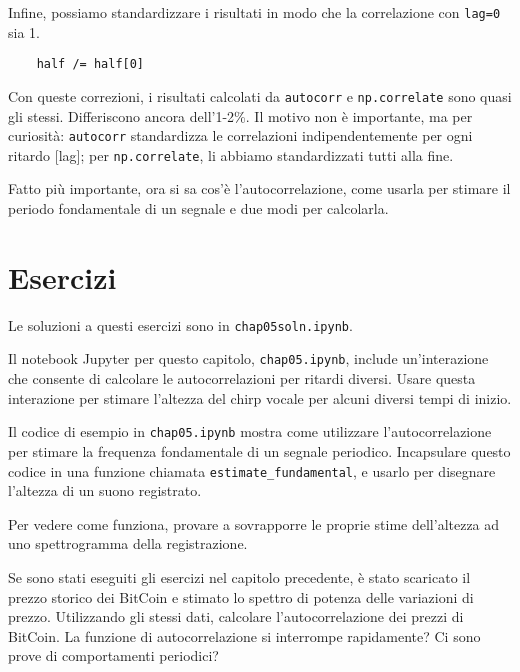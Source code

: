 \documentclass[12pt,a4paper]{book}
\begin{document}
Infine, possiamo standardizzare i risultati in modo che la correlazione con {\tt lag=0} sia 1.

\begin{verbatim} 
    half /= half[0]
 \end{verbatim} 

Con queste correzioni, i risultati calcolati da {\tt autocorr} e {\tt np.correlate} sono quasi gli stessi. Differiscono ancora dell'1-2\%. Il motivo non è importante, ma per curiosità: {\tt autocorr} standardizza le correlazioni indipendentemente per ogni ritardo [lag]; per {\tt np.correlate}, li abbiamo standardizzati tutti alla fine.

Fatto più importante, ora si sa cos'è l'autocorrelazione, come usarla per stimare il periodo fondamentale di un segnale e due modi per calcolarla.

\section{Esercizi} 

Le soluzioni a questi esercizi sono in {\tt chap05soln.ipynb}.

\begin{exercise} Il notebook Jupyter per questo capitolo, {\tt chap05.ipynb}, include un'interazione che consente di calcolare le autocorrelazioni per ritardi diversi. Usare questa interazione per stimare l'altezza del chirp vocale per alcuni diversi tempi di inizio. \end{exercise} 

\begin{exercise} Il codice di esempio in \verb"chap05.ipynb" mostra come utilizzare l'autocorrelazione per stimare la frequenza fondamentale di un segnale periodico. Incapsulare questo codice in una funzione chiamata \verb"estimate_fundamental", e usarlo per disegnare l'altezza di un suono registrato.

Per vedere come funziona, provare a sovrapporre le proprie stime dell'altezza ad uno spettrogramma della registrazione. \end{exercise} 

\begin{exercise} Se sono stati eseguiti gli esercizi nel capitolo precedente, è stato scaricato il prezzo storico dei BitCoin e stimato lo spettro di potenza delle variazioni di prezzo. Utilizzando gli stessi dati, calcolare l'autocorrelazione dei prezzi di BitCoin. La funzione di autocorrelazione si interrompe rapidamente? Ci sono prove di comportamenti periodici? \end{exercise} 
\end{document}
